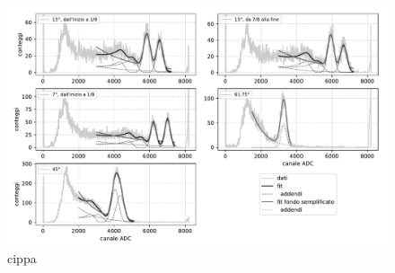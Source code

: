 \begin{figure}
	\hspace{-8em}\includegraphics[height=0.9\textwidth]{fit}
	\caption{\label{fig:fit}
	cippa}
\end{figure}
